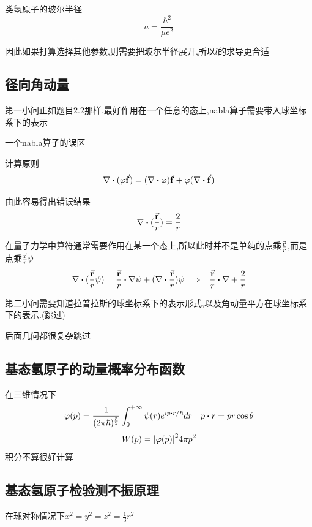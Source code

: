 \documentclass{article}
\begin{document}
            \begin{formal}
                类氢原子的玻尔半径
                $$ a = \dfrac{\hbar^{2}}{\mu e^{2}} $$
            \end{formal}

            因此如果打算选择其他参数,则需要把玻尔半径展开,所以$l$的求导更合适

        \subsection{径向角动量}
            第一小问正如题目2.2那样,最好作用在一个任意的态上,nabla算子需要带入球坐标系下的表示

            \begin{formal}
                一个nabla算子的误区

                计算原则
                $$ \nabla \vdot (\varphi \va{f}) = (\nabla \vdot \varphi)\va{f} + \varphi(\nabla \vdot \va{f}) $$

                由此容易得出错误结果
                $$ \nabla \vdot (\frac{\va{r}}{r}) = \frac{2}{r} $$

                在量子力学中算符通常需要作用在某一个态上,所以此时并不是单纯的点乘$\frac{\va{r}}{r}$,而是点乘$\frac{\va{r}}{r}\psi$
                $$ 
                \nabla \vdot (\frac{\va{r}}{r} \psi) = \frac{\va{r}}{r} \vdot \nabla \psi +  (\nabla \vdot \frac{\va{r}}{r}) \psi \lra 
                = \frac{\va{r}}{r} \vdot \nabla + \frac{2}{r}
                $$
            \end{formal}

            第二小问需要知道拉普拉斯的球坐标系下的表示形式,以及角动量平方在球坐标系下的表示.(跳过)

            后面几问都很复杂跳过

        \subsection{基态氢原子的动量概率分布函数}
            在三维情况下
            $$ \varphi(p) = \dfrac{1}{(2\pi \hbar)^{\frac{3}{2}}} \int_{0}^{+\infty} \psi(r) e^{i p \vdot r/ \hbar} dr  \quad p \vdot r = p r \cos{\theta} $$
            $$ W(p) = \abs{\varphi(p)}^{2} 4\pi p^{2}  $$
            积分不算很好计算

        \subsection{基态氢原子检验测不振原理}
            在球对称情况下$\overline{x^{2}} = \overline{y^{2}} = \overline{z^{2}} = \frac{1}{3} \overline{r^{2}} $
            
\end{document}
